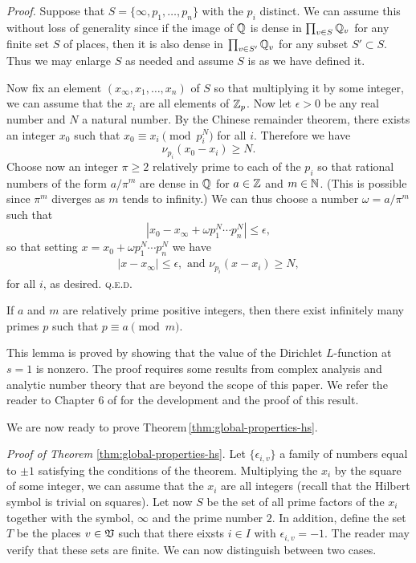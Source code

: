 \emph{Proof.} Suppose that \(S = \{\infty, p_1, \dots, p_n\}\) with the \(p_i\)
distinct. We can assume this without loss of generality since if the image of
\(\mathbb{Q}\) is dense in \(\prod_{v \in S} \mathbb{Q}_v\) for any finite set
\(S\) of places, then it is also dense in \(\prod_{v \in S'} \mathbb{Q}_v\) for
any subset \(S' \subset S\). Thus we may enlarge \(S\) as needed and assume
\(S\) is as we have defined it.

Now fix an element \((x_{\infty}, x_1, \dots, x_n)\) of \(S\) so that
multiplying it by some integer, we can assume that the \(x_i\) are all elements
of \(\mathbb{Z}_p\). Now let \(\epsilon > 0\) be any real number and \(N\) a
natural number. By the Chinese remainder theorem, there exists an integer
\(x_0\) such that \(x_0 \equiv x_i \pmod{p_i^N}\) for all \(i\). Therefore we
have
\[
    \nu_{p_i}(x_0 - x_i) \geq N.
\] 
Choose now an integer \(\pi \geq 2\) relatively prime to each of the \(p_i\)  so
that rational numbers of the form \(a/\pi^m\) are dense in \(\mathbb{Q}\) for
\(a \in \mathbb{Z}\) and \(m \in \mathbb{N}\). (This is possible since \(\pi^m\)
diverges as \(m\) tends to infinity.) We can thus choose a number \(\omega =
a/\pi^m\) such that
\[
    |x_0 - x_{\infty} + \omega p_1^N\cdots p_n^N| \leq \epsilon,
\]
so that setting \(x = x_0 + \omega p_1^N\cdots p_n^N\) we have
\begin{align*}
    |x - x_{\infty}| \leq \epsilon, \text{ and } \nu_{p_i}(x - x_i) \geq N,
\end{align*}
for all \(i\), as desired. {\scshape q.e.d.}

\medskip

\begin{lemmax}\label{lem:dirichlet}
    {\normalfont\cite[p.~25]{serre2012course}} If \(a\) and \(m\) are relatively
    prime positive integers, then there exist infinitely many primes \(p\) such
    that \(p \equiv a \pmod{m}\).
\end{lemmax}

This lemma is proved by showing that the value of the Dirichlet \(L\)-function
at \(s = 1\) is nonzero. The proof requires some results from complex analysis
and analytic number theory that are beyond the scope of this paper. We refer the
reader to Chapter 6 of \cite{serre2012course} for the development and the proof
of this result.

We are now ready to prove Theorem\,\ref{thm:global-properties-hs}.

\emph{Proof of Theorem} \ref{thm:global-properties-hs}. Let
\(\{\epsilon_{i,v}\}\) a family of numbers equal to \(\pm 1\) satisfying the
conditions of the theorem. Multiplying the \(x_i\) by the square of some
integer, we can assume that the \(x_i\) are all integers (recall that the
Hilbert symbol is trivial on squares). Let now \(S\) be the set of all prime
factors of the \(x_i\) together with the symbol, \(\infty\) and the prime number
\(2\). In addition, define the set \(T\) be the places \(v \in \mathfrak{V}\) such
that there eixsts \(i \in I\) with \(\epsilon_{i, v} = -1\). The reader may
verify that these sets  are finite. We can now distinguish between two cases.

